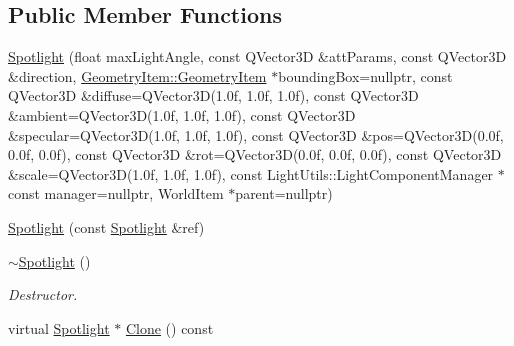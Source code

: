\subsection*{Public Member Functions}
\begin{DoxyCompactItemize}
\item 
\mbox{\hyperlink{class_geometry_engine_1_1_geometry_world_item_1_1_geometry_light_1_1_spotlight_a421172550334c85b4a8c5b129578ea22}{Spotlight}} (float max\+Light\+Angle, const Q\+Vector3D \&att\+Params, const Q\+Vector3D \&direction, \mbox{\hyperlink{class_geometry_engine_1_1_geometry_world_item_1_1_geometry_item_1_1_geometry_item}{Geometry\+Item\+::\+Geometry\+Item}} $\ast$bounding\+Box=nullptr, const Q\+Vector3D \&diffuse=Q\+Vector3D(1.\+0f, 1.\+0f, 1.\+0f), const Q\+Vector3\+D \&ambient=\+Q\+Vector3\+D(1.\+0f, 1.\+0f, 1.\+0f), const Q\+Vector3\+D \&specular=\+Q\+Vector3\+D(1.\+0f, 1.\+0f, 1.\+0f), const Q\+Vector3\+D \&pos=\+Q\+Vector3\+D(0.\+0f, 0.\+0f, 0.\+0f), const Q\+Vector3\+D \&rot=\+Q\+Vector3\+D(0.\+0f, 0.\+0f, 0.\+0f), const Q\+Vector3\+D \&scale=\+Q\+Vector3\+D(1.\+0f, 1.\+0f, 1.\+0f), const Light\+Utils\+::\+Light\+Component\+Manager $\ast$const manager=nullptr, World\+Item $\ast$parent=nullptr)
\item 
\mbox{\hyperlink{class_geometry_engine_1_1_geometry_world_item_1_1_geometry_light_1_1_spotlight_a9d503c8da14980a0e7df3c9c0edde42c}{Spotlight}} (const \mbox{\hyperlink{class_geometry_engine_1_1_geometry_world_item_1_1_geometry_light_1_1_spotlight}{Spotlight}} \&ref)
\item 
\mbox{\label{class_geometry_engine_1_1_geometry_world_item_1_1_geometry_light_1_1_spotlight_a316a8bfae90cfab961bb11f5242c82af}} 
\mbox{\hyperlink{class_geometry_engine_1_1_geometry_world_item_1_1_geometry_light_1_1_spotlight_a316a8bfae90cfab961bb11f5242c82af}{$\sim$\+Spotlight}} ()
\begin{DoxyCompactList}\small\item\em Destructor. \end{DoxyCompactList}\item 
virtual \mbox{\hyperlink{class_geometry_engine_1_1_geometry_world_item_1_1_geometry_light_1_1_spotlight}{Spotlight}} $\ast$ \mbox{\hyperlink{class_geometry_engine_1_1_geometry_world_item_1_1_geometry_light_1_1_spotlight_a7feb062f72b8110cf7d8d614d2daad92}{Clone}} () const
\end{DoxyCompactItemize}
